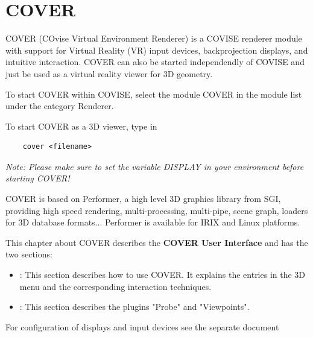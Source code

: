 
\begin{htmlonly}




\end{htmlonly}


\startdocument
\chapter{COVER}
\label{COVER}

COVER (COvise Virtual Environment Renderer) is a COVISE renderer module
with support for Virtual Reality (VR) input devices, backprojection displays,
and intuitive interaction. 
COVER can also be started independendly of COVISE and just be used as a virtual
reality viewer for 3D geometry.

To start COVER within COVISE, select the module COVER in the module list
under the category Renderer.

To start COVER as a 3D viewer, type in 
\begin{verbatim}
    cover <filename>
\end{verbatim}

{\it Note: Please make sure to set the variable DISPLAY in your environment before starting
COVER!}

COVER is based on Performer, a high level 3D graphics library from
SGI, providing high speed rendering, multi-processing, multi-pipe,
scene graph, loaders for 3D database formats...
Performer is available for IRIX and Linux platforms.

This chapter about COVER describes the {\large {\bf COVER User Interface}} and 
has the two sections:

\begin{itemize}
\item {}:
This section describes how to use COVER. It explains the entries in the 3D menu and the corresponding interaction techniques. 
\item  {} :
This section describes the plugins "Probe" and "Viewpoints".
\end{itemize}

For configuration of displays and input devices see the separate document \newline

